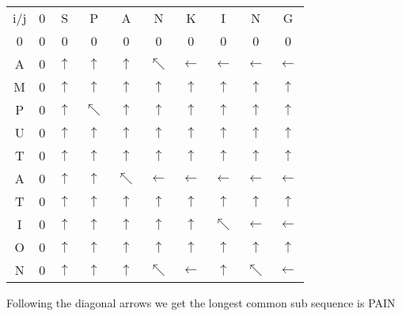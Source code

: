 \documentclass[11pt]{article}
\begin{document}
\begin{center}
 \begin{tabular}{||c c c c c c c c c c||} 
 \hline
 
 i/j &0& S & P & A & N & K & I & N & G \\ [0.5ex] 
 
 0 & 0 & 0 & 0 & 0 & 0 & 0&0&0 &0\\ 
 
 A & 0 & $\uparrow$   & $\uparrow$ & $\uparrow$ & $\nwarrow$ &$\leftarrow$&$\leftarrow$&$\leftarrow$&$\leftarrow$ \\
 
 M & 0 & $\uparrow$ & $\uparrow$ & $\uparrow$ & $\uparrow$ & $\uparrow$&$\uparrow$&$\uparrow$&$\uparrow$ \\ 
 
 P & 0 & $\uparrow$   & $\nwarrow$ & $\uparrow$& $\uparrow$& $\uparrow$&$\uparrow$&$\uparrow$&$\uparrow$\\ 
 
 U & 0 & $\uparrow$   & $\uparrow$ & $\uparrow$ &$\uparrow$ & $\uparrow$&$\uparrow$&$\uparrow$&$\uparrow$\\
 
 T & 0 & $\uparrow$   & $\uparrow$ & $\uparrow$ &$\uparrow$ & $\uparrow$&$\uparrow$&$\uparrow$&$\uparrow$\\
 
 A& 0 & $\uparrow$   & $\uparrow$ & $\nwarrow$ &$\leftarrow$ & $\leftarrow$&$\leftarrow$&$\leftarrow$&$\leftarrow$\\
 T& 0 & $\uparrow$   & $\uparrow$ & $\uparrow$ &$\uparrow$ & $\uparrow$&$\uparrow$&$\uparrow$&$\uparrow$\\
 
 I& 0 & $\uparrow$   & $\uparrow$ & $\uparrow$ &$\uparrow$ & $\uparrow$&$\nwarrow$&$\leftarrow$&$\leftarrow$\\

 O& 0 & $\uparrow$   & $\uparrow$ & $\uparrow$ &$\uparrow$ & $\uparrow$&$\uparrow$&$\uparrow$&$\uparrow$\\
 
 N& 0 & $\uparrow$   & $\uparrow$ & $\uparrow$ &$\nwarrow$ & $\leftarrow$&$\uparrow$&$\nwarrow$&$\leftarrow$\\[0.2ex]
 \hline
\end{tabular}
\end{center}
Following the diagonal arrows we get the longest common sub sequence is PAIN\\
\end{document}
